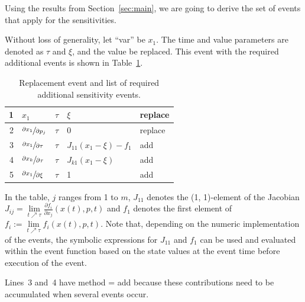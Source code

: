 \documentclass[journal, a4paper]{IEEEtran}
\begin{document}
Using the results from Section~\ref{sec:main}, we are going to derive the set of events that apply for the sensitivities.

Without loss of generality, let ``var'' be $x_1$. The time and value parameters are denoted as $\tau$ and $\xi$, and the value be replaced. This event with the required additional events is shown in Table~\ref{tab:replacement}.
\begin{table}[ht]
\caption{Replacement event and list of required additional sensitivity events.}
\label{tab:replacement}
\begin{center}
\begin{tabular}{|r|l|l|l|l|}\hline
     1 & $x_1$ & $\tau$ & $\xi$ & replace \\
     \hline
     2 & $\sfrac{\partial x_1}{\partial p_j}$ & $\tau$ & $0$ & replace \\
     3 & $\sfrac{\partial x_1}{\partial \tau}$ & $\tau$ & $J_{11}(x_1-\xi)-f_1$ & add \\
     4 & $\sfrac{\partial x_k}{\partial \tau}$ & $\tau$ & $J_{k1}(x_1-\xi)$ & add \\
     5 &$\sfrac{\partial x_1}{\partial \xi}$ & $\tau$ & 1 & add \\
     \hline
\end{tabular}
\end{center}
\end{table}
In the table, $j$ ranges from 1 to $m$, $J_{11}$ denotes the (1, 1)-element of the Jacobian $J_{ij} = \lim\limits_{t \nearrow \tau}\frac{\partial f_i}{\partial x_j}(x(t), p, t)$ and $f_1$ denotes the first element of $f_i := \lim\limits_{t \nearrow \tau}f_i(x(t), p, t)$. Note that, depending on the numeric implementation of the events, the symbolic expressions for $J_{11}$ and $f_1$ can be used and evaluated within the event function based on the state values at the event time before execution of the event.

Lines~3 and~4 have method = add because these contributions need to be accumulated when several events occur.
\end{document}
